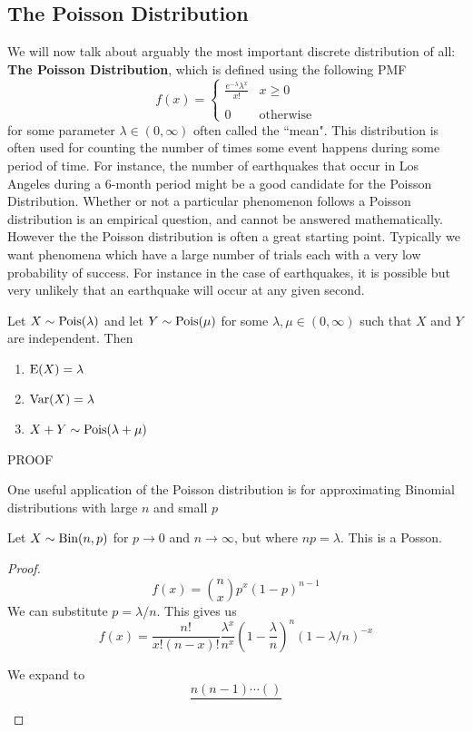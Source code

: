 \documentclass{report}
\begin{document}
\subsection{The Poisson Distribution}
\newcommand{\pois}{\textup{Pois}}
We will now talk about arguably the most important discrete distribution of all: \textbf{The Poisson Distribution}, which is defined using the following PMF
\[
    f(x)=\begin{cases}
        \displaystyle\frac{e^{-\lambda }\lambda^x}{x!} & x\ge 0
        \\\\
        0 & \text{otherwise}
    \end{cases}
\]
for some parameter $\lambda\in(0,\infty)$ often called the ``mean". This distribution is often used for counting the number of times some event happens during some period of time. For instance, the number of earthquakes that occur in Los Angeles during a 6-month period might be a good candidate for the Poisson Distribution. Whether or not a particular phenomenon follows a Poisson distribution is an empirical question, and cannot be answered mathematically. However the the Poisson distribution is often a great starting point. Typically we want phenomena which have a large number of trials each with a very low probability of success. For instance in the case of earthquakes, it is possible but very unlikely that an earthquake will occur at any given second.
\begin{theorem}
    Let $X\sim\pois(\lambda)$ and let $Y\sim\pois(\mu)$ for some $\lambda,\mu\in(0,\infty)$ such that $X$ and $Y$ are independent. Then
    \begin{enumerate}
        \item $\textup{E}(X)=\lambda$
        \item $\textup{Var}(X)=\lambda$
        \item $X+Y\sim\pois(\lambda+\mu)$
    \end{enumerate}
    \todo PROOF
\end{theorem}

One useful application of the Poisson distribution is for approximating Binomial distributions with large $n$ and small $p$


\begin{lemma}
    Let $X\sim\textup{Bin}(n,p)$ for $p\to 0$ and $n\to \infty$, but where $np=\lambda$. This is a Posson.
    \todo
    \begin{proof}
    
    
        \[
            f(x)=\binom nx p^x(1-p)^{n-1}
        \]
        We can substitute $p=\lambda/n$. This gives us
        \[
            f(x)=\frac{n!}{x!(n-x)!} \frac{\lambda^x}{n^x}(1-\frac \lambda n)^n (1-\lambda /n)^{-x}
        \]

        We expand to
        \[
            \frac{n(n-1)\cdots()}{}
        \]
    \end{proof}
\end{lemma}
\end{document}
